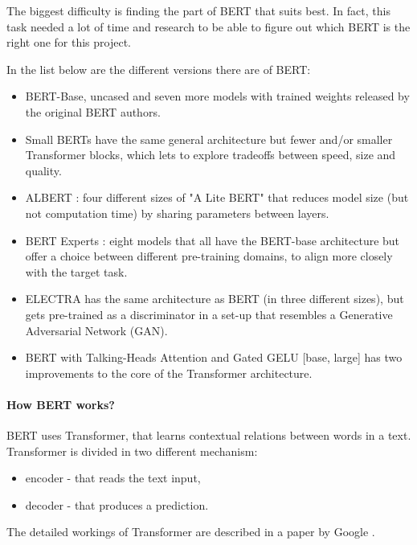 The biggest difficulty is finding the part of \gls{BERT} that suits best.
In fact, this task needed a lot of time and research to be able to figure out which \gls{BERT} is the right one for this project.

In the list below are the different versions there are of \gls{BERT}:

\begin{itemize}
    \item \gls{BERT}-Base, uncased and seven more models with trained weights released by the original \gls{BERT} authors.
    \item Small BERTs have the same general architecture but fewer and/or smaller Transformer blocks, which lets to explore tradeoffs between speed, size and quality.
    \item ALBERT \cite{lan_albert_2020}: four different sizes of "A Lite \gls{BERT}" that reduces model size (but not computation time) by sharing parameters between layers.
    \item \gls{BERT} Experts \cite{smit_chexbert_2020}: eight models that all have the \gls{BERT}-base architecture but offer a choice between different pre-training domains, to align more closely with the target task.
    \item ELECTRA \cite{clark_electra_2020} has the same architecture as \gls{BERT} (in three different sizes), but gets pre-trained as a discriminator in a set-up that resembles a Generative Adversarial Network (GAN).
    \item \gls{BERT} with Talking-Heads Attention \cite{shazeer_talking-heads_2020} and Gated GELU \cite{shazeer_glu_2020} [base, large] has two improvements to the core of the Transformer architecture.
\end{itemize}
    
\paragraph{How \gls{BERT} works?} \gls{BERT} uses Transformer, that learns contextual relations between words in a text.
Transformer is divided in two different mechanism:
\begin{itemize}
    \item encoder - that reads the text input,
    \item decoder - that produces a prediction.
\end{itemize}
The detailed workings of Transformer are described in a paper by Google \cite{vaswani_attention_2017}.

